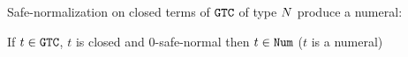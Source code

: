 Safe-normalization on closed terms of ${\tt GTC}$ of type ${N}$ produce a numeral:

\begin{proposition}
If $t \in {\tt GTC}$, $t$ is closed and $0$-safe-normal then $t \in {\tt Num}$ ($t$ is a numeral)
\end{proposition}


\newpage
